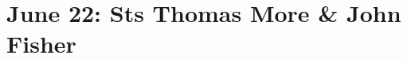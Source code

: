 {
\section{June 22: Sts Thomas More \& John Fisher}
\subtitle{ Class}
\subtitle{II Vespers}
\medskip

\def\deusinadjutoriumsolemn{F}
\def\vrlinebreak{F}
\def\preanttwo{\vspace{-0.5\baselineskip}}
\def\prepsalmthreeverses{\vspace{-0.1\baselineskip}}
\def\prerepeatantiphonthree{}
\def\prepsalmtitlefour{\vspace{-0.3\baselineskip}}
\def\prepsalmtitlefive{\vspace{-0.5\baselineskip}}
\def\begincollectcols{\begin{parcolumns}[rulebetween,colwidths={1=0.44\linewidth}]{2}}
\def\definevesperspropers{%
  
}

\bigskip
\benedicamusdomino{}
}